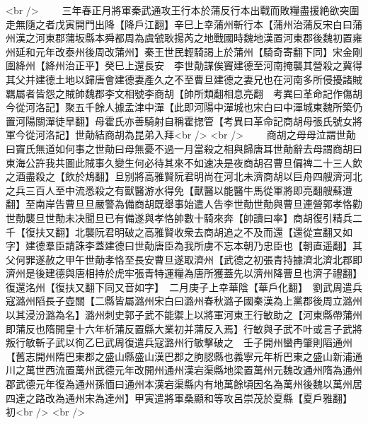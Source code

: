 <br />
　　三年春正月將軍秦武通攻王行本於蒲反行本出戰而敗糧盡援絶欲突圍走無隨之者戊寅開門出降【降戶江翻】辛巳上幸蒲州斬行本【蒲州治蒲反宋白曰蒲州漢之河東郡蒲坂縣本舜都周為虞虢耿揚芮之地戰國時魏地漢置河東郡後魏初置雍州延和元年改泰州後周改蒲州】秦王世民輕騎謁上於蒲州【騎奇寄翻下同】宋金剛圍絳州【絳州治正平】癸巳上還長安　李世勣謀俟竇建德至河南掩襲其營殺之冀得其父并建德土地以歸唐會建德妻產久之不至曹旦建德之妻兄也在河南多所侵擾諸賊羈屬者皆怨之賊帥魏郡李文相號李商胡【帥所類翻相息亮翻　考異曰革命記作傷胡今從河洛記】聚五千餘人據孟津中潬【此即河陽中潬城也宋白曰中潬城東魏所築仍置河陽關潬徒旱翻】母霍氏亦善騎射自稱霍揔管【考異曰革命記商胡母張氏號女將軍今從河洛記】世勣結商胡為昆弟入拜<br />
<br />
　　商胡之母母泣謂世勣曰竇氏無道如何事之世勣曰母無憂不過一月當殺之相與歸唐耳世勣辭去母謂商胡曰東海公許我共圖此賊事久變生何必待其來不如速决是夜商胡召曹旦偏禆二十三人飲之酒盡殺之【飲於鴆翻】旦别將高雅賢阮君明尚在河北未濟商胡以巨舟四艘濟河北之兵三百人至中流悉殺之有獸醫游水得免【獸醫以能醫牛馬從軍將即亮翻艘蘇遭翻】至南岸告曹旦旦嚴警為備商胡既舉事始遣人告李世勣世勣與曹旦連營郭孝恪勸世勣襲旦世勣未决聞旦已有備遂與孝恪帥數十騎來奔【帥讀曰率】商胡復引精兵二千【復扶又翻】北襲阮君明破之高雅賢收衆去商胡追之不及而還【還從宣翻又如字】建德羣臣請誅李蓋建德曰世勣唐臣為我所虜不忘本朝乃忠臣也【朝直遥翻】其父何罪遂赦之甲午世勣孝恪至長安曹旦遂取濟州【武德之初張青持據濟北濟北郡即濟州是後建德與唐相持於虎牢張青特運糧為唐所獲蓋先以濟州降曹旦也濟子禮翻】復還洺州【復扶又翻下同又音如字】　二月庚子上幸華陰【華戶化翻】　劉武周遣兵寇潞州䧟長子壺關【二縣皆屬潞州宋白曰潞州春秋潞子國秦漢為上黨郡後周立潞州以其浸汾潞為名】潞州刺史郭子武不能禦上以將軍河東王行敏助之【河東縣帶蒲州即蒲反也隋開皇十六年析蒲反置縣大業初并蒲反入焉】行敏與子武不叶或言子武將叛行敏斬子武以徇乙巳武周復遣兵寇潞州行敏擊破之　壬子開州蠻冉肇則䧟通州【舊志開州隋巴東郡之盛山縣盛山漢巴郡之朐䏰縣也義寧元年析巴東之盛山新浦通川之萬世西流置萬州武德元年改開州通州漢宕渠縣地梁置萬州元魏改通州隋為通州郡武德元年復為通州孫愐曰通州本漢宕渠縣内有地萬餘頃因名為萬州後魏以萬州居四達之路改為通州宋為達州】甲寅遣將軍桑顯和等攻呂崇茂於夏縣【夏戶雅翻】　初<br />
<br />

